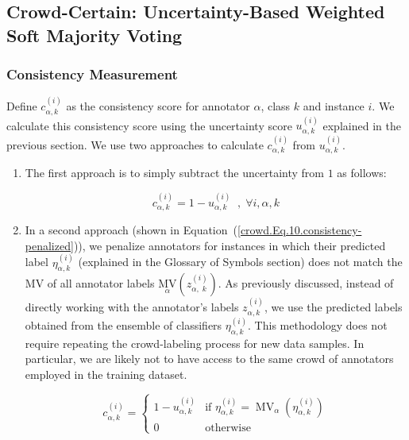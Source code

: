 \subsection{Crowd-Certain: Uncertainty-Based Weighted Soft Majority Voting}

\subsubsection{Consistency Measurement}

Define $c_{\alpha,k}^{(i)} $ as the consistency score for annotator $\alpha $, class $k $ and instance $i $. We calculate this consistency score using the uncertainty score $u_{\alpha,k}^{(i)} $ explained in the previous section. We use two approaches to calculate $c_{\alpha,k}^{(i)} $ from $u_{\alpha,k}^{(i)} $.

\begin{enumerate}
    \item The first approach is to simply subtract the uncertainty from $1 $ as follows:

    \begin{equation}
        c_{\alpha,k}^{(i)}=1-u_{\alpha,k}^{(i)}\;\;,\;\forall i,\alpha,k
        \label{crowd.Eq.9.consistency}
    \end{equation}

    \item In a second approach (shown in Equation~(\ref{crowd.Eq.10.consistency-penalized})), we penalize annotators for instances in which their predicted label $\eta_{\alpha,k}^{(i)} $ (explained in the Glossary of Symbols section) does not match the MV of all annotator labels ${{\underset \alpha{\mathrm{MV}}}{\left(z_{\alpha,\;k}^{(i)}\right)}} $. As previously discussed, instead of directly working with the annotator's labels $z_{\alpha,k}^{(i)} $, we use the predicted labels obtained from the ensemble of classifiers $\eta_{\alpha,k}^{(i)} $. This methodology does not require repeating the crowd-labeling process for new data samples. In particular, we are likely not to have access to the same crowd of annotators employed in the training dataset.

    \begin{equation}
        c_{\alpha,k}^{(i)} =
        \begin{cases}
            1 - u_{\alpha,k}^{(i)} & \text{if } \eta_{\alpha,k}^{(i)} = \operatorname{MV}_{\alpha}(\eta_{\alpha,k}^{(i)}) \\
            0 & \text{otherwise}
        \end{cases}
        \label{crowd.Eq.10.consistency-penalized}
    \end{equation}

\end{enumerate}

